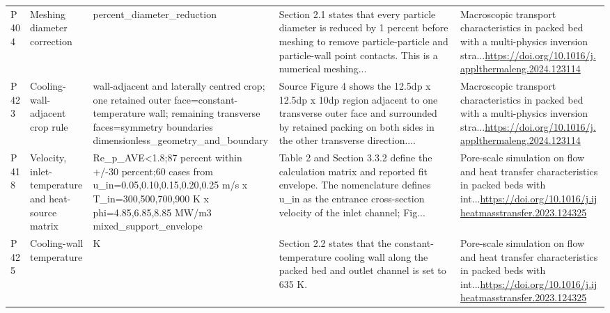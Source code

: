 \begin{longtable}{>{\raggedright\arraybackslash}p{1.05cm}>{\raggedright\arraybackslash}p{2.45cm}>{\raggedright\arraybackslash}p{2.65cm}>{\raggedright\arraybackslash}p{3.65cm}>{\raggedright\arraybackslash}p{5.25cm}}
P404 & Meshing diameter correction & 1 percent\_\allowbreak{}diameter\_\allowbreak{}reduction & Section 2.1 states that every particle diameter is reduced by 1 percent before meshing to remove particle-particle and particle-wall point contacts. This is a numerical meshing... & Macroscopic transport characteristics in packed bed with a multi-physics inversion stra...\newline \url{https://doi.org/10.1016/j.applthermaleng.2024.123114} \\
P423 & Cooling-wall-adjacent crop rule & wall-adjacent and laterally centred crop;\allowbreak{} one retained outer face=\allowbreak{}constant-temperature wall;\allowbreak{} remaining transverse faces=\allowbreak{}symmetry boundaries dimensionless\_\allowbreak{}geometry\_\allowbreak{}and\_\allowbreak{}boundary & Source Figure 4 shows the 12.5dp x 12.5dp x 10dp region adjacent to one transverse outer face and surrounded by retained packing on both sides in the other transverse direction.... & Macroscopic transport characteristics in packed bed with a multi-physics inversion stra...\newline \url{https://doi.org/10.1016/j.applthermaleng.2024.123114} \\
P418 & Velocity,\allowbreak{} inlet-temperature and heat-source matrix & Re\_\allowbreak{}p\_\allowbreak{}AVE<1.8;\allowbreak{}87 percent within +/\allowbreak{}-30 percent;\allowbreak{}60 cases from u\_\allowbreak{}in=\allowbreak{}0.05,\allowbreak{}0.10,\allowbreak{}0.15,\allowbreak{}0.20,\allowbreak{}0.25 m/\allowbreak{}s x T\_\allowbreak{}in=\allowbreak{}300,\allowbreak{}500,\allowbreak{}700,\allowbreak{}900 K x phi=\allowbreak{}4.85,\allowbreak{}6.85,\allowbreak{}8.85 MW/\allowbreak{}m3 mixed\_\allowbreak{}support\_\allowbreak{}envelope & Table 2 and Section 3.3.2 define the calculation matrix and reported fit envelope. The nomenclature defines u\_\allowbreak{}in as the entrance cross-section velocity of the inlet channel;\allowbreak{} Fig... & Pore-scale simulation on flow and heat transfer characteristics in packed beds with int...\newline \url{https://doi.org/10.1016/j.ijheatmasstransfer.2023.124325} \\
P425 & Cooling-wall temperature & 635 K & Section 2.2 states that the constant-temperature cooling wall along the packed bed and outlet channel is set to 635 K. & Pore-scale simulation on flow and heat transfer characteristics in packed beds with int...\newline \url{https://doi.org/10.1016/j.ijheatmasstransfer.2023.124325} \\

\end{longtable}
